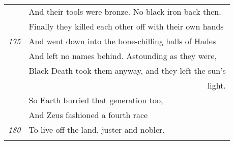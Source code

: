 \begin{tabular}[bht]{rl}
& And their tools were bronze. No black iron back then. \\
& Finally they killed each other off with their own hands \\
\tiny{\em 175} & And went down into the bone-chilling halls of Hades \\
& And left no names behind. Astounding as they were, \\
& Black Death took them anyway, and they left the sun's \\
  \multicolumn{2}{r}{ light.} \\
& So Earth burried that generation too, \\[1ex]
& And Zeus fashioned a fourth race \\
\tiny{\em 180}& To live off the land, juster and nobler, \\ \\
\end{tabular}
